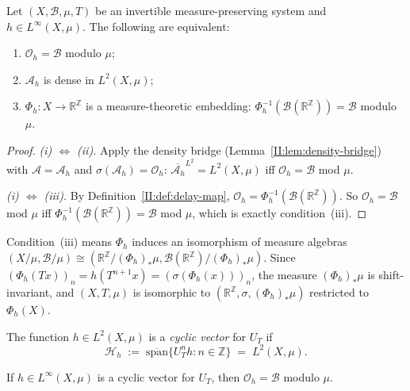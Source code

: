 \begin{theorem}
\label{II:thm:reconstruction}
Let $(X, \mathcal{B}, \mu, T)$ be an invertible measure-preserving system and
$h \in L^\infty(X, \mu)$.  The following are equivalent:
\begin{enumerate}[label=(\roman*)]
  \item $\mathcal{O}_h = \mathcal{B}$ modulo $\mu$;
  \item $\mathcal{A}_h$ is dense in $L^2(X, \mu)$;
  \item $\Phi_h : X \to \mathbb{R}^\mathbb{Z}$ is a measure-theoretic embedding:
    $\Phi_h^{-1}(\mathcal{B}(\mathbb{R}^\mathbb{Z})) = \mathcal{B}$ modulo $\mu$.
\end{enumerate}
\end{theorem}

\begin{proof}
\emph{(i) $\Leftrightarrow$ (ii).}
Apply the density bridge (Lemma~\ref{II:lem:density-bridge}) with
$\mathcal{A} = \mathcal{A}_h$ and $\sigma(\mathcal{A}_h) = \mathcal{O}_h$:
$\overline{\mathcal{A}_h}^{L^2} = L^2(X, \mu)$ iff $\mathcal{O}_h = \mathcal{B}$
mod $\mu$.

\emph{(i) $\Leftrightarrow$ (iii).}
By Definition~\ref{II:def:delay-map},
$\mathcal{O}_h = \Phi_h^{-1}(\mathcal{B}(\mathbb{R}^\mathbb{Z}))$.
So $\mathcal{O}_h = \mathcal{B}$ mod $\mu$ iff
$\Phi_h^{-1}(\mathcal{B}(\mathbb{R}^\mathbb{Z})) = \mathcal{B}$ mod $\mu$,
which is exactly condition~(iii).
\end{proof}

Condition~(iii) means $\Phi_h$ induces an isomorphism of measure algebras
$(X/\mu, \mathcal{B}/\mu) \cong (\mathbb{R}^\mathbb{Z}/(\Phi_h)_*\mu,
\mathcal{B}(\mathbb{R}^\mathbb{Z})/(\Phi_h)_*\mu)$.
Since $(\Phi_h(Tx))_n = h(T^{n+1}x) = (\sigma(\Phi_h(x)))_n$, the measure
$(\Phi_h)_*\mu$ is shift-invariant, and $(X, T, \mu)$ is isomorphic to
$(\mathbb{R}^\mathbb{Z}, \sigma, (\Phi_h)_*\mu)$ restricted to $\Phi_h(X)$.


\begin{definition}
\label{II:def:cyclic}
The function $h \in L^2(X, \mu)$ is a \emph{cyclic vector} for $U_T$ if
\[
  \mathcal{H}_h
  \;:=\;
  \overline{\mathrm{span}}\!\bigl\{U_T^n h : n \in \mathbb{Z}\bigr\}
  \;=\; L^2(X, \mu).
\]
\end{definition}

\begin{corollary}
\label{II:cor:cyclic-implies-reconstruction}
If $h \in L^\infty(X, \mu)$ is a cyclic vector for $U_T$, then
$\mathcal{O}_h = \mathcal{B}$ modulo $\mu$.
\end{corollary}

